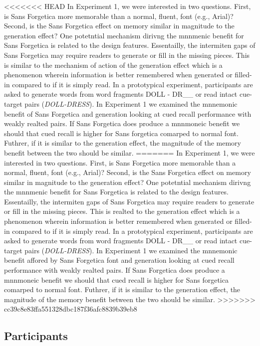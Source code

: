 \documentclass[pdf]{apa6}
\begin{document}
<<<<<<< HEAD
In Experiment 1, we were interested in two questions. First, is Sans Forgetica more memorable than a normal, fluent, font (e.g., Arial)? Second, is the Sans Forgetica effect on memory similar in magnitude to the generation effect? One potetntial mechanism dirivng the mnnmenic benefit for Sans Forgetica is related to the design features. Essentailly, the intermiten gaps of Sans Forgetica may require readers to generate or fill in the missing pieces. This is similar to the mechanism of action of the generation effect which is a phenomenon wherein information is better remembered when generated or filled-in compared to if it is simply read. In a prototypical experiment, participants are asked to generate words from word fragments DOLL - DR\_\_ or read intact cue-target pairs (\emph{DOLL-DRESS}). In Experiment 1 we examined the mnnemonic benefit of Sans Forgetica and generation looking at cued recall performance with weakly realted pairs. If Sans Forgetica does produce a mnnmoneic benefit we should that cued recall is higher for Sans forgetica comarped to normal font. Futhrer, if it is similar to the generation effect, the magnitude of the memory benefit between the two should be similar.
=======
In Experiment 1, we were interested in two questions. First, is Sans Forgetica more memorable than a normal, fluent, font (e.g., Arial)? Second, is the Sans Forgetica effect on memory similar in magnitude to the generation effect? One potetntial mechanism dirivng the mnnmenic benefit for Sans Forgetica is related to the design features. Essentailly, the intermiten gaps of Sans Forgetica may require readers to generate or fill in the missing pieces. This is realted to the generation effect which is a phenomenon wherein information is better remembered when generated or filled-in compared to if it is simply read. In a prototypical experiment, participants are asked to generate words from word fragments DOLL - DR\_\_ or read intact cue-target pairs (\emph{DOLL-DRESS}). In Experiment 1 we examined the mnnemonic benefit affored by Sans Forgetica font and generation looking at cued recall performance with weakly realted pairs. If Sans Forgetica does produce a mnnmoneic benefit we should that cued recall is higher for Sans forgetica comarped to normal font. Futhrer, if it is similar to the generation effect, the magnitude of the memory benefit between the two should be similar.
>>>>>>> cc39c8e83ffa551328dbc187f36afc8839b39eb8

\hypertarget{participants}{%
\subsection{Participants}\label{participants}}
\end{document}
